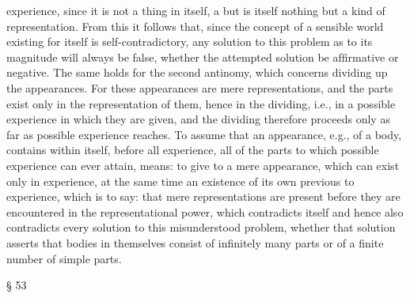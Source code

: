 experience, since it is not a thing in itself, a but is itself nothing but a
kind of representation. From this it follows that, since the concept of a
sensible world existing for itself is self-contradictory, any solution to this
problem as to its magnitude will always be false, whether the attempted
solution be afﬁrmative or negative.
The same holds for the second antinomy, which concerns dividing
up the appearances. For these appearances are mere representations,
and the parts exist only in the representation of them, hence in the
dividing, i.e., in a possible experience in which they are given, and the
dividing therefore proceeds only as far as possible experience reaches. To
assume that an appearance, e.g., of a body, contains within itself, before
all experience, all of the parts to which possible experience can ever attain,
means: to give to a mere appearance, which can exist only in experience,
at the same time an existence of its own previous to experience, which is to
say: that mere representations are present before they are encountered
in the representational power, which contradicts itself and hence also
contradicts every solution to this misunderstood problem, whether that
solution asserts that bodies in themselves consist of inﬁnitely many parts
or of a ﬁnite number of simple parts.

§ 53


